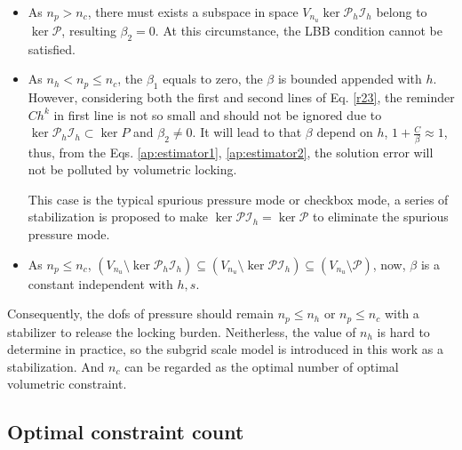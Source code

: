 \begin{pf}
\begin{itemize}
    \item As $n_p > n_c$, there must exists a subspace in space $V_{n_u}\ker \mathcal P_h \mathcal I_h$ belong to $\ker \mathcal P$, resulting $\beta_2 = 0$. At this circumstance, the LBB condition cannot be satisfied.
    \item As $n_h < n_p \le n_c$, the $\beta_1$ equals to zero, the $\beta$ is bounded appended with $h$. However, considering both the first and second lines of Eq. \eqref{r23}, the reminder $Ch^k$ in first line is not so small and should not be ignored due to $\ker \mathcal P_h \mathcal I_h \subset \ker P$ and $\beta_2 \ne 0$. 
    It will lead to that $\beta$ depend on $h$, $1+\frac{C}{\beta} \approx 1$, thus, from the Eqs. \eqref{ap:estimator1}, \eqref{ap:estimator2}, the solution error will not be polluted by volumetric locking.

    This case is the typical spurious pressure mode or checkbox mode, a series of stabilization \cite{vadala-roth2020} is proposed to make $\ker \mathcal P \mathcal I_h = \ker \mathcal P$ to eliminate the spurious pressure mode.
\item As $n_p \le n_c$, $(V_{n_u}\setminus \ker \mathcal P_h \mathcal I_h) \subseteq (V_{n_u}\setminus \ker \mathcal P \mathcal I_h) \subseteq (V_{n_u}\setminus \mathcal P)$, now, $\beta$ is a constant independent with $h,s$.
\end{itemize}

    Consequently, the dofs of pressure should remain $n_p\le n_h$ or $n_p\le n_c$ with a stabilizer to release the locking burden. Neitherless, the value of $n_h$ is hard to determine in practice, so the subgrid scale model \cite{hughes1986} is introduced in this work as a stabilization. And $n_c$ can be regarded as the optimal number of optimal volumetric constraint.
\end{pf}

\subsection{Optimal constraint count}

